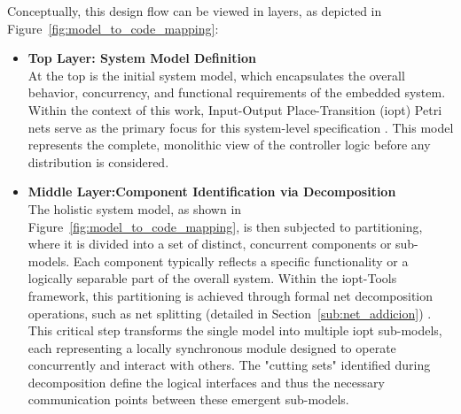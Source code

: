 Conceptually, this design flow can be viewed in layers, as depicted in Figure~\ref{fig:model_to_code_mapping}:

\begin{itemize}
    \item \textbf{Top Layer: System Model Definition} \\
    At the top is the initial system model, which encapsulates the overall behavior, concurrency, and functional requirements of the embedded system. Within the context of this work, Input-Output Place-Transition (\gls{iopt}) Petri nets serve as the primary focus for this system-level specification \cite{iopttools, RefiningIOPT}. This model represents the complete, monolithic view of the controller logic before any distribution is considered.

    \item \textbf{Middle Layer:Component Identification via Decomposition} \\
    The holistic system model, as shown in Figure~\ref{fig:model_to_code_mapping}, is then subjected to partitioning, where it is divided into a set of distinct, concurrent components or sub-models. Each component typically reflects a specific functionality or a logically separable part of the overall system. Within the \gls{iopt}-Tools framework, this partitioning is achieved through formal net decomposition operations, such as net splitting (detailed in Section~\ref{sub:net_addicion}) \cite{Barrosadd, apresentacao}. This critical step transforms the single model into multiple \gls{iopt} sub-models, each representing a locally synchronous module designed to operate concurrently and interact with others. The "cutting sets" identified during decomposition define the logical interfaces and thus the necessary communication points between these emergent sub-models.


\end{itemize}
